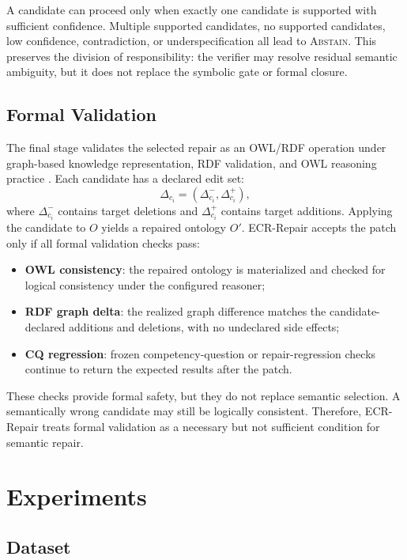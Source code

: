 \documentclass[conference]{IEEEtran}
\begin{document}
A candidate can proceed only when exactly one candidate is supported with sufficient confidence. Multiple supported candidates, no supported candidates, low confidence, contradiction, or underspecification all lead to \textsc{Abstain}. This preserves the division of responsibility: the verifier may resolve residual semantic ambiguity, but it does not replace the symbolic gate or formal closure.

\subsection{Formal Validation}

The final stage validates the selected repair as an OWL/RDF operation under graph-based knowledge representation, RDF validation, and OWL reasoning practice \cite{hogan2021knowledgegraphs,pareti2021shaclreview,heist2021caligraph}. Each candidate has a declared edit set:
\[
\Delta_{c_i}=(\Delta^-_{c_i},\Delta^+_{c_i}),
\]
where $\Delta^-_{c_i}$ contains target deletions and $\Delta^+_{c_i}$ contains target additions. Applying the candidate to $O$ yields a repaired ontology $O'$. ECR-Repair accepts the patch only if all formal validation checks pass:
\begin{itemize}
    \item \textbf{OWL consistency}: the repaired ontology is materialized and checked for logical consistency under the configured reasoner;
    \item \textbf{RDF graph delta}: the realized graph difference matches the candidate-declared additions and deletions, with no undeclared side effects;
    \item \textbf{CQ regression}: frozen competency-question or repair-regression checks continue to return the expected results after the patch.
\end{itemize}

These checks provide formal safety, but they do not replace semantic selection. A semantically wrong candidate may still be logically consistent. Therefore, ECR-Repair treats formal validation as a necessary but not sufficient condition for semantic repair.

\section{Experiments}

\subsection{Dataset}
\end{document}
